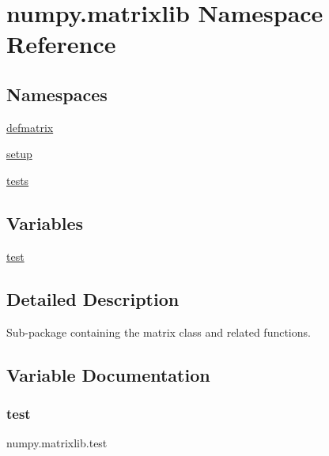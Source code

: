 \hypertarget{namespacenumpy_1_1matrixlib}{}\section{numpy.\+matrixlib Namespace Reference}
\label{namespacenumpy_1_1matrixlib}
\subsection*{Namespaces}
\begin{DoxyCompactItemize}
\item 
 \hyperlink{namespacenumpy_1_1matrixlib_1_1defmatrix}{defmatrix}
\item 
 \hyperlink{namespacenumpy_1_1matrixlib_1_1setup}{setup}
\item 
 \hyperlink{namespacenumpy_1_1matrixlib_1_1tests}{tests}
\end{DoxyCompactItemize}
\subsection*{Variables}
\begin{DoxyCompactItemize}
\item 
\hyperlink{namespacenumpy_1_1matrixlib_aee00242cbaae677f8e851d22c54610d6}{test}
\end{DoxyCompactItemize}


\subsection{Detailed Description}
\begin{DoxyVerb}Sub-package containing the matrix class and related functions.\end{DoxyVerb}
 

\subsection{Variable Documentation}
\mbox{\label{namespacenumpy_1_1matrixlib_aee00242cbaae677f8e851d22c54610d6}} 
\subsubsection{\texorpdfstring{test}{test}}
{\footnotesize\ttfamily numpy.\+matrixlib.\+test}


